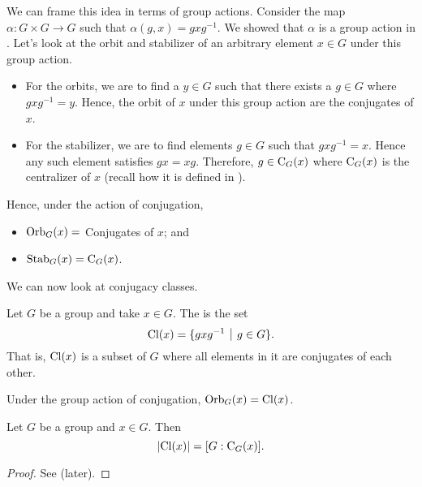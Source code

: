 We can frame this idea in terms of group actions. Consider the map $\alpha: G\times G\to G$ such that $\alpha(g, x) = gxg^{-1}$. We showed that $\alpha$ is a group action in . Let's look at the orbit and stabilizer of an arbitrary element $x \in G$ under this group action.
\begin{itemize}
    \item For the orbits, we are to find a $y \in G$ such that there exists a $g \in G$ where $gxg^{-1} = y$. Hence, the orbit of $x$ under this group action are the conjugates of $x$.
    \item For the stabilizer, we are to find elements $g \in G$ such that $gxg^{-1} = x$. Hence any such element satisfies $gx = xg$. Therefore, $g \in \mathrm{C}_{G}(x)$ where $\mathrm{C}_{G}(x)$ is the centralizer of $x$ (recall how it is defined in ).
\end{itemize}

Hence, under the action of conjugation,
\begin{itemize}
    \item $\mathrm{Orb}_{G}(x) = $ Conjugates of $x$; and
    \item $\mathrm{Stab}_{G}(x) = \mathrm{C}_{G}(x)$.
\end{itemize}

We can now look at conjugacy classes.
\begin{definition}
    Let $G$ be a group and take $x \in G$. The  is the set
    \[
        \Cl{x} = \{gxg^{-1} \vert g \in G\}.
    \]
    That is, $\mathrm{Cl}(x)$ is a subset of $G$ where all elements in it are conjugates of each other.
\end{definition}
\begin{remark}
    Under the group action of conjugation, $\mathrm{Orb}_{G}(x) = \mathrm{Cl}(x)$.
\end{remark}

\begin{proposition}\label{prop-cardinality-of-conjugacy-class}
    Let $G$ be a group and $x \in G$. Then
    \[
        |\mathrm{Cl}(x)| = [G : \mathrm{C}_{G}(x)].
    \]
\end{proposition}
\begin{proof}
    See  (later).
\end{proof}

